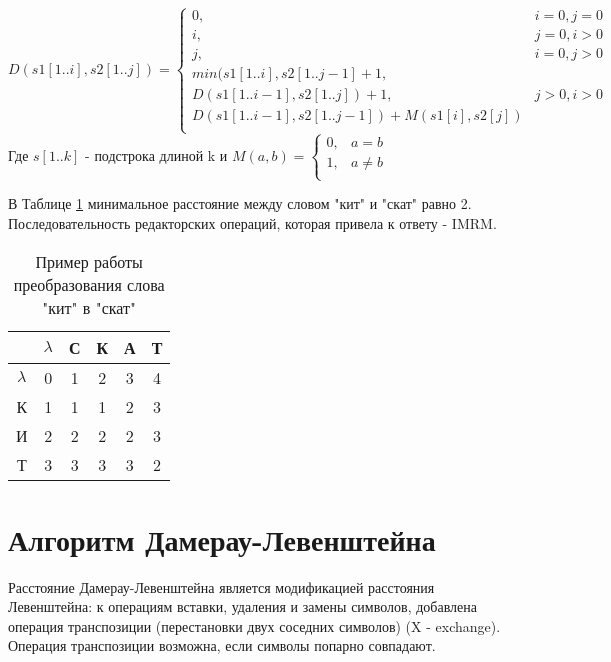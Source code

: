     \begin{equation}\label{formula:Levenshtein}
        D(s1[1..i],s2[1..j]) = \left\{ \begin{array}{ll}
            0, & \textrm{$i = 0, j = 0$}\\
            i, & \textrm{$j = 0, i > 0$}\\
            j, & \textrm{$i = 0, j > 0$}\\
           min(s1[1..i],s2[1..j-1]+ 1,\\
           D(s1[1..i-1],s2[1..j]) + 1, &\textrm{$j>0, i>0$}\\
           D(s1[1..i-1],s2[1..j-1]) + M(s1[i], s2[j])\\
        \end{array} \right.
    \end{equation}
    Где $s[1..k]$ - подстрока длиной k и 
    $M(a, b) = \left\{ \begin{array}{ll}
        0, & \textrm{$a = b$}\\
        1, & \textrm{$a \ne b$}\\
    \end{array} \right.$

    В Таблице \ref{table:example:Levenshtein} минимальное расстояние между
    словом "кит" и "скат" равно 2. Последовательность редакторских операций, 
    которая привела к ответу - IMRM.

    \begin{table}[h]
        \caption{Пример работы преобразования слова "кит" в "скат"}
        \begin{tabular}{|c|c|c|c|c|c|}
        \hline
  & $\lambda$ & С & К & А & Т \\ \hline
$\lambda$ & 0 & 1 & 2 & 3 & 4 \\ \hline
        К & 1 & 1 & 1 & 2 & 3 \\ \hline
        И & 2 & 2 & 2 & 2 & 3 \\ \hline
        Т & 3 & 3 & 3 & 3 & \cellcolor[HTML]{FFCCC9}2 \\ \hline
        \end{tabular}
        \label{table:example:Levenshtein}
    \end{table}

    \section{Алгоритм Дамерау-Левенштейна}  
    Расстояние Дамерау-Левенштейна является модификацией расстояния Левенштейна:
    к операциям вставки, удаления и замены символов, добавлена операция транспозиции (перестановки
    двух соседних символов) (X - exchange). Операция транспозиции возможна, если символы попарно совпадают.

